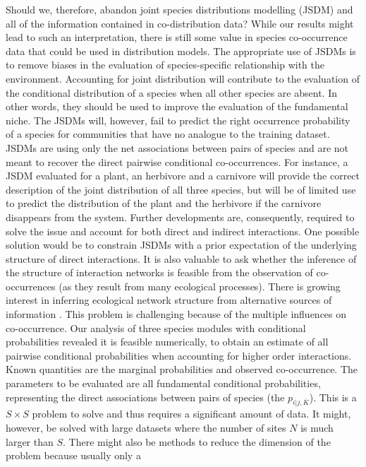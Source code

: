 Should we, therefore, abandon joint species distributions modelling (JSDM) and all of the information contained in co-distribution data? While our results might lead to such an interpretation, there is still some value in species co-occurrence data that could be used in distribution models. The appropriate use of JSDMs is to remove biases in the evaluation of species-specific relationship with the environment. Accounting for joint distribution will contribute to the evaluation of the conditional distribution of a species when all other species are absent. In other words, they should be used to improve the evaluation of the fundamental niche. The JSDMs will, however, fail to
predict the right occurrence probability of a species for communities that
have no analogue to the training dataset. JSDMs are using only the net
associations between pairs of species and are not meant to recover the direct
pairwise conditional co-occurrences. For instance, a JSDM evaluated for a plant, an herbivore and a carnivore will provide the correct description of the joint distribution of all three species, but will be of limited use to predict the distribution of the plant and the herbivore if the carnivore disappears from the system. Further developments are, consequently, required to solve the issue and account for both direct and indirect interactions. One possible solution would be to constrain JSDMs with a prior expectation of the underlying
structure of direct interactions.
%
It is also valuable to ask whether the inference of the structure of interaction
networks is feasible from the observation of co-occurrences (as they result
from many ecological processes).
There is growing interest in inferring ecological network structure from alternative sources of information \citep{Gravel2013, Morales-Castilla2015}.
This problem is challenging because of the multiple influences on co-occurrence. Our analysis of three species modules with conditional probabilities revealed it is feasible numerically, to obtain an estimate of all pairwise
conditional probabilities when accounting for higher order interactions. Known
quantities are the marginal probabilities and observed co-occurrence. The
parameters to be evaluated are all fundamental conditional probabilities,
representing the direct associations between pairs of species (the
$p_{i|j,\overline{K}}$). This is a $S \times S$ problem to solve and thus
requires a significant amount of data. It might, however, be solved with large
datasets where the number of sites $N$ is much larger than $S$. There might
also be methods to reduce the dimension of the problem because usually only a
